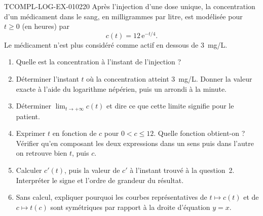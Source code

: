 \begin{exercice}{TCOMPL-LOG-EX-010}{2}{20}
Après l'injection d'une dose unique, la concentration d'un médicament dans le
sang, en milligrammes par litre, est modélisée pour $t\geqslant 0$ (en heures) par
\[
  c(t)=12\,\mathrm{e}^{-t/4}.
\]
Le médicament n'est plus considéré comme actif en dessous de $3$~mg/L.
\begin{enumerate}
  \item Quelle est la concentration à l'instant de l'injection ?
  \item Déterminer l'instant $t$ où la concentration atteint $3$~mg/L. Donner la
    valeur exacte à l'aide du logarithme népérien, puis un arrondi à la minute.
  \item Déterminer $\displaystyle\lim_{t\to+\infty}c(t)$ et dire ce que cette
    limite signifie pour le patient.
  \item Exprimer $t$ en fonction de $c$ pour $0<c\leqslant 12$. Quelle fonction
    obtient-on ? Vérifier qu'en composant les deux expressions dans un sens puis
    dans l'autre on retrouve bien $t$, puis $c$.
  \item Calculer $c'(t)$, puis la valeur de $c'$ à l'instant trouvé à la
    question~2. Interpréter le signe et l'ordre de grandeur du résultat.
  \item Sans calcul, expliquer pourquoi les courbes représentatives de
    $t\mapsto c(t)$ et de $c\mapsto t(c)$ sont symétriques par rapport à la
    droite d'équation $y=x$.
\end{enumerate}
\end{exercice}
